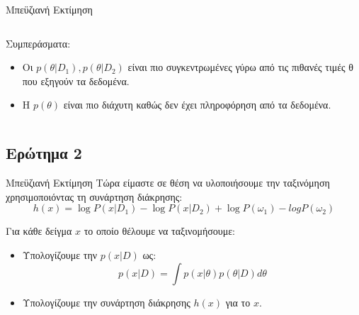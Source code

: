 \documentclass{beamer}
\begin{document}
\begin{frame}{Μπεϋζιανή Εκτίμηση}
{\begin{columns}[T]
\begin{columns}[T]
    \end{columns}
    \end{columns}%
    }

    \vfill
    \begin{columns}[T]
        \begin{column}{\textwidth}
        Συμπεράσματα: 
        \begin{itemize}
            \item Οι $p(\theta|D_1),p(\theta|D_2)$ είναι πιο συγκεντρωμένες γύρω από τις πιθανές τιμές θ που εξηγούν τα δεδομένα.
            \item Η $p(\theta)$ είναι πιο διάχυτη καθώς δεν έχει πληροφόρηση από τα δεδομένα.
        \end{itemize}
    \end{column}
    \end{columns}
\end{frame}

\subsection{Ερώτημα 2}
\begin{frame}{Μπεϋζιανή Εκτίμηση}
    Τώρα είμαστε σε θέση να υλοποιήσουμε την ταξινόμηση χρησιμοποιόντας τη συνάρτηση διάκρησης:
    \begin{equation}
        h(x) = \log P(x|D_1) - \log P(x|D_2) + \log P(\omega_1) -log P(\omega_2)
    \end{equation}
    
    Για κάθε δείγμα $x$ το οποίο θέλουμε να ταξινομήσουμε: 
    \begin{itemize}
        \item Υπολογίζουμε την $p(x|D)$ ως: \begin{equation}
        p(x|D) = \int p(x|\theta) p(\theta|D) d\theta 
    \end{equation}
    \item Υπολογίζουμε την συνάρτηση διάκρησης $h(x)$ για το $x$.
    \end{itemize}
    
\end{frame}
\end{document}

